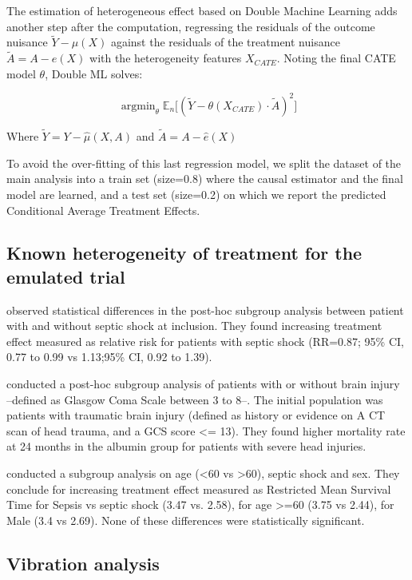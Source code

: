 \documentclass[french,12pt,twoside,a4paper]{book}
\DeclareMathOperator*{\argmin}{argmin} \def\mycitecolor{green!50!black}
\begin{document}
\begin{appendices}
  The estimation of heterogeneous effect based on Double Machine Learning adds
  another step after the computation, regressing the residuals of the outcome
  nuisance $\tilde{Y} - \mu(X)$ against the residuals of the treatment nuisance
  $\tilde{A} = A - e(X)$ with the heterogeneity features $X_{CATE}$. Noting the
  final CATE model $\theta$, Double ML solves:

  $$\argmin_{\theta} \mathbb E_n \big[(\tilde{Y} - \theta(X_{CATE}) \cdot \tilde{A})^2\big ]$$

  Where $\tilde{Y} = Y - \hat \mu(X, A)$ and $\tilde{A} = A - \hat e(X)$

  To avoid the over-fitting of this last regression model, we split the dataset of
  the main analysis into a train set (size=0.8) where the causal estimator and the final
  model are learned, and a test set (size=0.2) on which we report the predicted Conditional Average
  Treatment Effects.

  \subsection{Known heterogeneity of treatment for the emulated trial}\label{apd:cate_literature}

  \cite{caironi2014albumin} observed statistical differences in the post-hoc
  subgroup analysis between patient with and without septic shock at inclusion.
  They found increasing treatment effect measured as relative risk for patients
  with septic shock (RR=0.87; 95\% CI, 0.77 to 0.99 vs 1.13;95\% CI, 0.92 to 1.39).

  \cite{safe2007saline} conducted a post-hoc subgroup analysis of patients with or
  without brain injury --defined as Glasgow Coma Scale between 3 to 8--. The
  initial population was patients with traumatic brain injury (defined as history
  or evidence on A CT scan of head trauma, and a GCS score <= 13). They found
  higher mortality rate at 24 months in the albumin group for patients with severe
  head injuries.

  \cite{zhou2021early} conducted a subgroup analysis on age (<60 vs >60), septic
  shock and sex. They conclude for increasing treatment effect measured as
  Restricted Mean Survival Time for Sepsis vs septic shock (3.47 vs. 2.58), for
  age >=60 (3.75 vs 2.44), for Male (3.4 vs 2.69). None of these differences were
  statistically significant.

  \subsection{Vibration analysis}\label{apd:cate_results}


\end{appendices}
\end{document}
